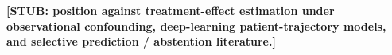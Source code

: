 \textbf{[STUB: position against treatment-effect estimation under
observational confounding, deep-learning patient-trajectory models, and
selective prediction / abstention literature.]}
